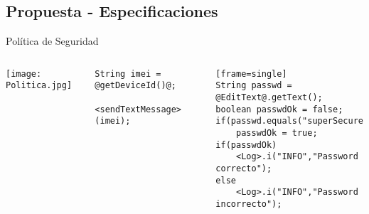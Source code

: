 \subsection{Propuesta - Especificaciones}
\begin{frame}[fragile]{Política de Seguridad}
\begin{columns}[T]
\column{1.5in}
	\texttt{[image: Politica.jpg]} 
	\pause
\column{2.5in}
\begin{lstlisting}[style=base]
	String imei = @getDeviceId()@;
	<sendTextMessage>(imei);
\end{lstlisting}
\pause
\begin{lstlisting}[style=base][frame=single]
String passwd = @EditText@.getText();
boolean passwdOk = false;
if(passwd.equals("superSecure"))
	passwdOk = true;
if(passwdOk)
	<Log>.i("INFO","Password correcto");
else
	<Log>.i("INFO","Password incorrecto");
\end{lstlisting}
% 	
\end{columns}
\end{frame}

